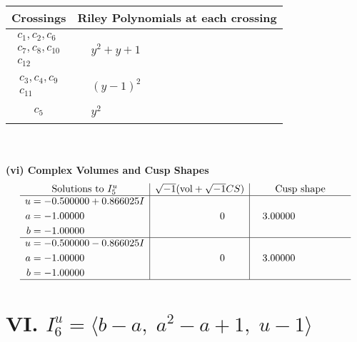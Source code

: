 \documentclass[1p]{elsarticle_modified}
\theoremstyle{definition}
\newcommand{\I}{\sqrt{-1}}
\begin{document}
\begin{tabular}{m{50pt}|m{274pt}}
Crossings & \hspace{64pt}Riley Polynomials at each crossing \\
\hline $$\begin{aligned}c_{1},c_{2},c_{6}\\c_{7},c_{8},c_{10}\\c_{12}\end{aligned}$$&$\begin{aligned}
&y^2+y+1
\end{aligned}$\\
\hline $$\begin{aligned}c_{3},c_{4},c_{9}\\c_{11}\end{aligned}$$&$\begin{aligned}
&(y-1)^2
\end{aligned}$\\
\hline $$\begin{aligned}c_{5}\end{aligned}$$&$\begin{aligned}
&y^2
\end{aligned}$\\
\hline
\end{tabular}\\~\\
\newpage\flushleft \textbf{(vi) Complex Volumes and Cusp Shapes}
$$\begin{array}{c|c|c}  
\text{Solutions to }I^u_{5}& \I (\text{vol} + \sqrt{-1}CS) & \text{Cusp shape}\\
 \hline 
\begin{aligned}
u &= -0.500000 + 0.866025 I \\
a &= -1.00000\phantom{ +0.000000I} \\
b &= -1.00000\phantom{ +0.000000I}\end{aligned}
 & \phantom{-0.000000 } 0 & \phantom{-}3.00000\phantom{ +0.000000I} \\ \hline\begin{aligned}
u &= -0.500000 - 0.866025 I \\
a &= -1.00000\phantom{ +0.000000I} \\
b &= -1.00000\phantom{ +0.000000I}\end{aligned}
 & \phantom{-0.000000 } 0 & \phantom{-}3.00000\phantom{ +0.000000I}\\
 \hline 
 \end{array}$$\newpage\newpage\renewcommand{\arraystretch}{1}
\centering \section*{VI. $I^u_{6}= \langle b- a,\;a^2- a+1,\;u-1 \rangle$}
\end{document}
